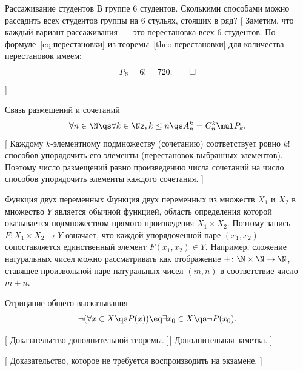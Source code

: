 {Рассаживание студентов}
{
    В группе $6$ студентов.
    Сколькими способами можно рассадить всех студентов группы на $6$ стульях, стоящих в ряд?
}[
    Заметим, что каждый вариант рассаживания~--- это перестановка всех $6$ студентов.
    По формуле~\eqref{eq:перестановки} из теоремы~\ref{theo:перестановки} для количества перестановок имеем:
    \begin{equation*}
        P_6 = 6! = 720.\qedhere
    \end{equation*}
]

{Связь размещений и сочетаний}{
    \begin{equation*}
        \forall n \in \N \qs
        \forall k \in \Nz, k \le n \qs
        A_n^k = C_n^k \mul P_k.
    \end{equation*}
}[
    Каждому $k$-элементному подмножеству (сочетанию) соответствует ровно $k!$ способов упорядочить его элементы (перестановок выбранных элементов).
    Поэтому число размещений равно произведению числа сочетаний на число способов упорядочить элементы каждого сочетания.
]

{Функция двух переменных}
{
    Функция двух переменных из множеств $X_1$ и $X_2$ в множество $Y$ является обычной функцией, область определения которой оказывается подмножеством прямого произведения $X_1 \times X_2$.
    Поэтому запись $F \colon X_1 \times X_2 \to Y$ означает, что каждой упорядоченной паре $(x_1, x_2)$ сопоставляется единственный элемент $F(x_1, x_2) \in Y$.
    Например, сложение натуральных чисел можно рассматривать как отображение $\mathord{+} \colon \N \times \N \to \N$, ставящее произвольной паре натуральных чисел $(m, n)$ в соответствие число $m + n$.
}


{Отрицание общего высказывания}{
    \begin{equation*}
        \lnot (\forall x \in X \qs P(x))
        \eq
        \exists x_0 \in X \qs \lnot P(x_0).
    \end{equation*}
}


[
    Доказательство дополнительной теоремы.
][
    Дополнительная заметка.
]

[
    Доказательство, которое не требуется воспроизводить на экзамене.
]

